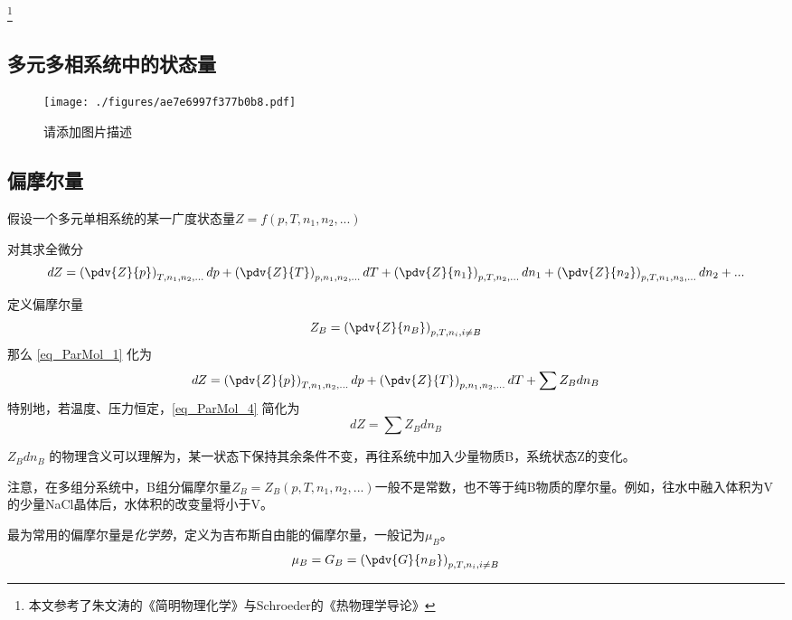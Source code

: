 

\footnote{本文参考了朱文涛的《简明物理化学》与Schroeder的《热物理学导论》}

\subsection{多元多相系统中的状态量}
\begin{figure}[ht]
\centering
\texttt{[image: ./figures/ae7e6997f377b0b8.pdf]}
\caption{请添加图片描述} \label{fig_ParMol_1}
\end{figure}
\subsection{偏摩尔量}
假设一个多元单相系统的某一广度状态量$Z=f(p,T,n_1,n_2,...)$

对其求全微分
\begin{equation}\label{eq_ParMol_1}
dZ = \left(\pdv{Z}{p}\right)_{T,n_1,n_2,...}dp + \left(\pdv{Z}{T}\right)_{p,n_1,n_2,...}dT+\left(\pdv{Z}{n_1}\right)_{p,T,n_2,...}dn_1+\left(\pdv{Z}{n_2}\right)_{p,T,n_1,n_3,...}dn_2+...
\end{equation}

定义偏摩尔量
\begin{equation}
{Z_B} = \left(\pdv{Z}{n_B}\right)_{p,T,n_i, i \neq B} 
\end{equation}
那么 \autoref{eq_ParMol_1} 化为 
\begin{equation}\label{eq_ParMol_4}
dZ = \left(\pdv{Z}{p}\right)_{T,n_1,n_2,...}dp + \left(\pdv{Z}{T}\right)_{p,n_1,n_2,...}dT+\sum {Z_B} dn_B
\end{equation}
特别地，若温度、压力恒定，\autoref{eq_ParMol_4} 简化为
\begin{equation}\label{eq_ParMol_3}
dZ = \sum {Z_B} dn_B
\end{equation}

${Z_B} d n_B$ 的物理含义可以理解为，某一状态下保持其余条件不变，再往系统中加入少量物质B，系统状态Z的变化。

注意，在多组分系统中，B组分偏摩尔量${Z_B}={Z_B}(p,T,n_1,n_2,...)$一般不是常数，也不等于纯B物质的摩尔量。例如，往水中融入体积为V的少量NaCl晶体后，水体积的改变量将小于V。

最为常用的偏摩尔量是\textsl{化学势}，定义为吉布斯自由能的偏摩尔量，一般记为$\mu_B$。
\begin{equation}
\mu_B={G_B} = \left(\pdv{G}{n_B}\right)_{p,T,n_i, i \neq B} 
\end{equation}

